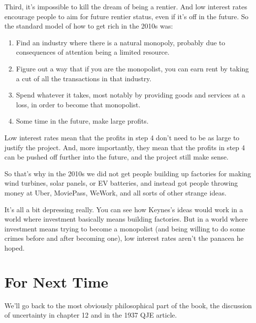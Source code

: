 \documentclass[
  11pt,
  letterpaper,
  DIV=11,
  numbers=noendperiod,
  oneside]{scrartcl}
\providecommand{\tightlist}{%
  \setlength{\itemsep}{0pt}\setlength{\parskip}{0pt}}\usepackage{longtable,booktabs,array}
\begin{document}
Third, it's impossible to kill the dream of being a rentier. And low
interest rates encourage people to aim for future rentier status, even
if it's off in the future. So the standard model of how to get rich in
the 2010s was:

\begin{enumerate}
\def\labelenumi{\arabic{enumi}.}
\tightlist
\item
  Find an industry where there is a natural monopoly, probably due to
  consequences of attention being a limited resource.
\item
  Figure out a way that if you are the monopolist, you can earn rent by
  taking a cut of all the transactions in that industry.
\item
  Spend whatever it takes, most notably by providing goods and services
  at a loss, in order to become that monopolist.
\item
  Some time in the future, make large profits.
\end{enumerate}

Low interest rates mean that the profits in step 4 don't need to be as
large to justify the project. And, more importantly, they mean that the
profits in step 4 can be pushed off further into the future, and the
project still make sense.

So that's why in the 2010s we did not get people building up factories
for making wind turbines, solar panels, or EV batteries, and instead got people throwing
money at Uber, MoviePass, WeWork, and all sorts of other strange ideas.

It's all a bit depressing really. You can see how Keynes's ideas would
work in a world where investment basically means building factories. But
in a world where investment means trying to become a monopolist (and
being willing to do some crimes before and after becoming one), low
interest rates aren't the panacea he hoped.

\section{For Next Time}\label{for-next-time}

We'll go back to the most obviously philosophical part of the book, the
discussion of uncertainty in chapter 12 and in the 1937 QJE article.
\end{document}

